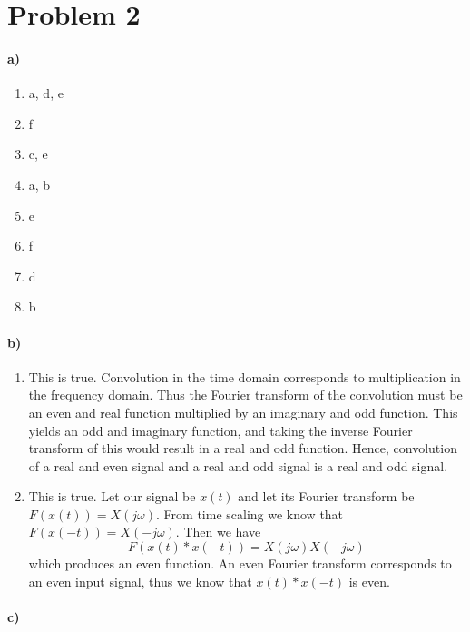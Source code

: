 \documentclass[12pt]{article}
\begin{document}
\section*{Problem 2}

\paragraph{a)}

\begin{enumerate}
    \item a, d, e
    \item f
    \item c, e
    \item a, b
    \item e
    \item f
    \item d
    \item b
\end{enumerate}

\paragraph{b)}

\begin{enumerate}
    \item This is true. Convolution in the time domain corresponds to multiplication in the frequency domain. Thus the Fourier transform of the convolution must be an even and real function
    multiplied by an imaginary and odd function. This yields an odd and imaginary function, and taking the inverse Fourier transform of this would result in a real and odd function. Hence, convolution
    of a real and even signal and a real and odd signal is a real and odd signal.
    \item This is true. Let our signal be \(x(t)\) and let its Fourier transform be \(F(x(t))=X(j\omega)\). From time scaling we know that \(F(x(-t))=X(-j\omega)\). Then we have
    \[F(x(t)*x(-t))=X(j\omega)X(-j\omega)\]
    which produces an even function. An even Fourier transform corresponds to an even input signal, thus we know that \(x(t)*x(-t)\) is even.
\end{enumerate}

\paragraph{c)}
\end{document}
